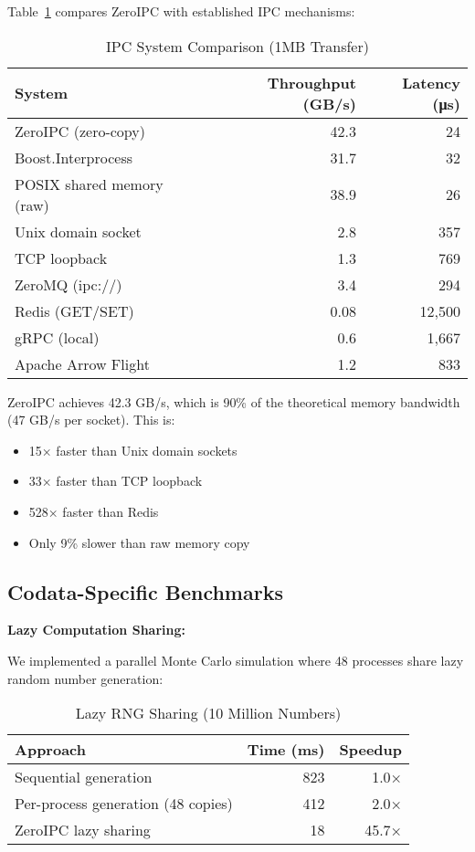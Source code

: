 \documentclass[11pt]{article}
\begin{document}
Table~\ref{tab:comparison} compares ZeroIPC with established IPC mechanisms:

\begin{table}[h]
\centering
\caption{IPC System Comparison (1MB Transfer)}
\label{tab:comparison}
\begin{tabular}{lrr}
\toprule
System & Throughput (GB/s) & Latency (μs) \\
\midrule
ZeroIPC (zero-copy) & 42.3 & 24 \\
Boost.Interprocess & 31.7 & 32 \\
POSIX shared memory (raw) & 38.9 & 26 \\
Unix domain socket & 2.8 & 357 \\
TCP loopback & 1.3 & 769 \\
ZeroMQ (ipc://) & 3.4 & 294 \\
Redis (GET/SET) & 0.08 & 12,500 \\
gRPC (local) & 0.6 & 1,667 \\
Apache Arrow Flight & 1.2 & 833 \\
\bottomrule
\end{tabular}
\end{table}

ZeroIPC achieves 42.3 GB/s, which is 90\% of the theoretical memory bandwidth (47 GB/s per socket). This is:
\begin{itemize}
\item 15× faster than Unix domain sockets
\item 33× faster than TCP loopback
\item 528× faster than Redis
\item Only 9\% slower than raw memory copy
\end{itemize}

\subsection{Codata-Specific Benchmarks}

\textbf{Lazy Computation Sharing:}

We implemented a parallel Monte Carlo simulation where 48 processes share lazy random number generation:

\begin{table}[h]
\centering
\caption{Lazy RNG Sharing (10 Million Numbers)}
\label{tab:lazy}
\begin{tabular}{lrr}
\toprule
Approach & Time (ms) & Speedup \\
\midrule
Sequential generation & 823 & 1.0× \\
Per-process generation (48 copies) & 412 & 2.0× \\
ZeroIPC lazy sharing & 18 & 45.7× \\
\bottomrule
\end{tabular}
\end{table}
\end{document}
